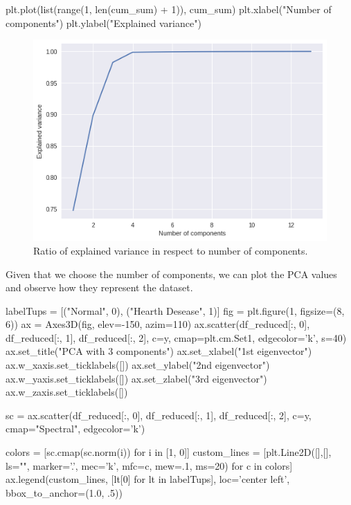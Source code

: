 \documentclass[12pt]{article}
\begin{document}
\begin{python}
    plt.plot(list(range(1, len(cum_sum) + 1)), cum_sum)
    plt.xlabel("Number of components")
    plt.ylabel("Explained variance")
\end{python}

\begin{figure}[H]
    \centering
    \includegraphics[width=\textwidth]{img/variance-components.png}
    \caption{Ratio of explained variance in respect to number of components.}
\end{figure}

Given that we choose the number of components, we can plot the PCA values and observe how they represent the dataset.

\begin{python}
    labelTups = [("Normal", 0), ("Hearth Desease", 1)]
    fig = plt.figure(1, figsize=(8, 6))
    ax = Axes3D(fig, elev=-150, azim=110)
    ax.scatter(df_reduced[:, 0], df_reduced[:, 1], df_reduced[:, 2], c=y,
            cmap=plt.cm.Set1, edgecolor='k', s=40)
    ax.set_title("PCA with 3 components")
    ax.set_xlabel("1st eigenvector")
    ax.w_xaxis.set_ticklabels([])
    ax.set_ylabel("2nd eigenvector")
    ax.w_yaxis.set_ticklabels([])
    ax.set_zlabel("3rd eigenvector")
    ax.w_zaxis.set_ticklabels([])

    sc = ax.scatter(df_reduced[:, 0], df_reduced[:, 1], df_reduced[:, 2], c=y, cmap="Spectral", edgecolor='k')

    colors = [sc.cmap(sc.norm(i)) for i in [1, 0]]
    custom_lines = [plt.Line2D([],[], ls="", marker='.', 
                    mec='k', mfc=c, mew=.1, ms=20) for c in colors]
    ax.legend(custom_lines, [lt[0] for lt in labelTups], 
            loc='center left', bbox_to_anchor=(1.0, .5))
\end{python}
\end{document}
